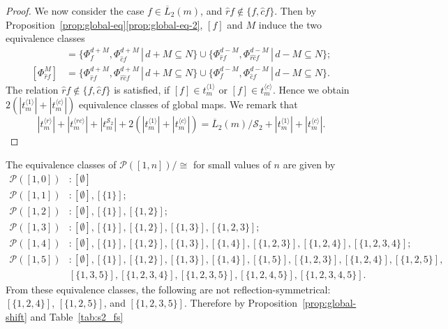 \documentclass[a4paper]{article}
\begin{document}
\begin{proof}
We now consider the case $f \in \overline{L}_2(m)$, and $\hat{r}f \not\in \{f, \hat{c}f \}$.
Then by Proposition~\ref{prop:global-eq}\ref{prop:global-eq-2}, $[f]$ and $M$ induce the two equivalence classes
\begin{align*}
[\Phi^M_f] & = \{ \Phi^{d+M}_f, \Phi^{d+M}_{\hat{c}f} \, | \, d + M \subseteq N \}
\cup  \{ \Phi^{d-M}_{\hat{r}f}, \Phi^{d-M}_{\widehat{rc}f} \, | \, d  -M \subseteq N \}; \\
[\Phi^M_{\hat{r}f}] & = \{ \Phi^{d+M}_{\hat{r}f}, \Phi^{d+M}_{\widehat{rc}f} \, | \, d + M \subseteq N \}
\cup  \{ \Phi^{d-M}_{f}, \Phi^{d-M}_{\hat{c}f} \, | \, d  -M \subseteq N \}.
\end{align*}
The relation $\hat{r}f \not\in \{f, \hat{c}f \}$ is satisfied, if
$[f] \in t^{\langle 1 \rangle}_{m}$ or $[f] \in t^{\langle c \rangle}_{m}$.
Hence we obtain $2 (|t^{\langle 1 \rangle}_{m}| + |t^{\langle c \rangle}_{m}|)$
equivalence classes of global maps.
We remark that
\[
|t^{\langle r \rangle}_{m}| + |t^{\langle rc \rangle}_{m}| + |t^{\mathcal{S}_2}_{m}|
+ 2 (|t^{\langle 1 \rangle}_{m}| + |t^{\langle c \rangle}_{m}|)
= \overline{L}_2(m) / \mathcal{S}_2 + |t^{\langle 1 \rangle}_{m}| + |t^{\langle c \rangle}_{m}|.
\]
\end{proof}
The equivalence classes of $\mathcal{P}([1,n])/{\cong}$ for small values of $n$ are given by
\begin{align*}
\mathcal{P}([1,0]) & : [\emptyset] \\
\mathcal{P}([1,1]) & : [\emptyset], [\{1\}];  \\
\mathcal{P}([1,2]) & : [\emptyset], [\{1\}],  [\{1,2\}]; \\
\mathcal{P}([1,3]) & : [\emptyset], [\{1\}],  [\{1,2\}], [\{1,3\}], [\{1,2,3\}]; \\
\mathcal{P}([1,4]) & : [\emptyset], [\{1\}],  [\{1,2\}], [\{1,3\}], [\{1,4\}], [\{1,2,3\}], [\{1,2,4\}], [\{1,2,3,4\}]; \\
\mathcal{P}([1,5]) & : [\emptyset], [\{1\}],  [\{1,2\}], [\{1,3\}], [\{1,4\}], [\{1,5\}], [\{1,2,3\}], [\{1,2,4\}], [\{1,2,5\}], \\
        &  [\{1,3,5\}], [\{1,2,3,4\}], [\{1,2,3,5\}], [\{1,2,4,5\}], [\{1,2,3,4,5\}].
\end{align*}
From these equivalence classes, the following are not reflection-symmetrical: $[\{1,2,4\}]$, $[\{1,2,5\}]$, and $[\{1,2,3,5\}]$.
Therefore by Proposition~\ref{prop:global-shift} and Table~\ref{tab:s2_fs}
\end{document}
